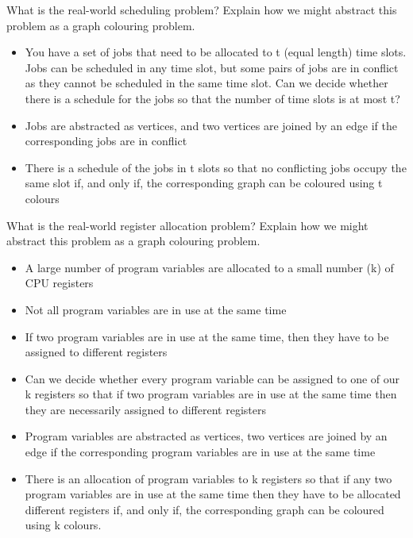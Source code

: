 \documentclass{exam}
\begin{document}
\begin{questions}
\question[4]What is the real-world scheduling problem? Explain how we might abstract this problem as a graph colouring problem.
\begin{solution}[2in]
\begin{itemize}
	\item You have a set of jobs that need to be allocated to t (equal length) time slots. Jobs can be scheduled in any time slot, but some pairs of jobs are in conflict as they cannot be scheduled in the same time slot. Can we decide whether there is a schedule for the jobs so that the number of time slots is at most t?
	\item Jobs are abstracted as vertices, and two vertices are joined by an edge if the corresponding jobs are in conflict
	\item There is a schedule of the jobs in t slots so that no conflicting jobs occupy the same slot if, and only if, the corresponding graph can be coloured using t colours
\end{itemize}
\end{solution}
\newpage
\question[4]What is the real-world register allocation problem? Explain how we might abstract this problem as a graph colouring problem.
\begin{solution}[2in]
\begin{itemize}
	\item A large number of program variables are allocated to a small number (k) of CPU registers
	\item Not all program variables are in use at the same time
	\item If two program variables are in use at the same time, then they have to be assigned to different registers
	\item Can we decide whether every program variable can be assigned to one of our k registers so that if two program variables are in use at the same time then they are necessarily assigned to different registers
	\item Program variables are abstracted as vertices, two vertices are joined by an edge if the corresponding program variables are in use at the same time
	\item There is an allocation of program variables to k registers so that if any two program variables are in use at the same time then they have to be allocated different registers if, and only if, the corresponding graph can be coloured using k colours.
\end{itemize}
\end{solution}


\end{questions}
\end{document}

